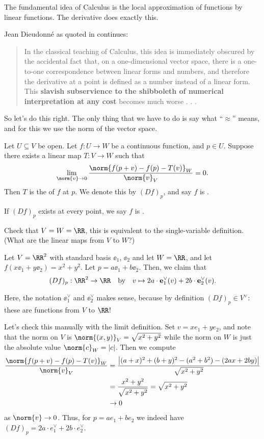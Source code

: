 \documentclass[11pt]{scrreprt}
\begin{document}
\begin{moral}
	The fundamental idea of Calculus is the local approximation of functions by linear functions.
	The derivative does exactly this.
\end{moral}
Jean Dieudonn\'e as quoted in \cite{ref:pugh} continues:
\begin{quote}
	In the classical teaching of Calculus, this idea is immediately obscured
	by the accidental fact that, on a one-dimensional vector space,
	there is a one-to-one correspondence between linear forms and numbers,
	and therefore the derivative at a point is defined as a number instead of a linear form.
	This \textbf{slavish subservience to the shibboleth of numerical interpretation at any cost}
	becomes much worse . . .
\end{quote}

So let's do this right.
The only thing that we have to do is say what ``$\approx$'' means, and for
this we use the norm of the vector space.
\begin{definition}
	Let $U \subseteq V$ be open.
	Let $f : U \to W$ be a continuous function, and $p \in U$.
	Suppose there exists a linear map $T : V \to W$ such that
	\[
		\lim_{\norm{v} \to 0}
		\frac{\norm{f(p + v) - f(p) - T(v)}_W}{\norm{v}_V} = 0.
	\]
	Then $T$ is the  of $f$ at $p$.
	We denote this by $(Df)_p$, and say $f$ is .

	If $(Df)_p$ exists at every point, we say $f$ is .
\end{definition}

\begin{ques}
	Check that $V = W = \RR$, this is equivalent to the single-variable definition.
	(What are the linear maps from $V$ to $W$?)
\end{ques}
\begin{example}[Total Derivative of $f(x,y) = x^2+y^2$]
	Let $V = \RR^2$ with standard basis $\ee_1$, $\ee_2$ and let $W = \RR$,
	and let $f\left( x \ee_1 + y \ee_2 \right) = x^2+y^2$.  Let $p = a\ee_1 + b\ee_2$.
	Then, we claim that \[ (Df)_p : \RR^2 \to \RR \quad\text{by}\quad
	v \mapsto 2a \cdot \ee_1^\vee(v) + 2b \cdot \ee_2^\vee(v). \]
\end{example}
Here, the notation $\ee_1^\vee$ and $\ee_2^\vee$ makes sense,
because by definition $(Df)_p \in V^\vee$: these are functions from $V$ to $\RR$!

Let's check this manually with the limit definition.
Set $v = xe_1 + ye_2$, and note that the norm on $V$ is $\norm{(x,y)}_V = \sqrt{x^2+y^2}$
while the norm on $W$ is just the absolute value $\norm{c}_W = \left\lvert c \right\rvert$.
Then we compute
\begin{align*}
	\frac{\norm{f(p + v) - f(p) - T(v)}_W}{\norm{v}_V} 
	&= \frac{\left\lvert (a+x)^2 + (b+y)^2 - (a^2+b^2) - (2ax+2by) \right\rvert}{\sqrt{x^2+y^2}} \\
	&= \frac{x^2+y^2}{\sqrt{x^2+y^2}} = \sqrt{x^2+y^2} \\
	&\to 0
\end{align*}
as $\norm{v} \to 0$.
Thus, for $p = ae_1 + be_2$ we indeed have $(Df)_p = 2a \cdot e_1^\vee + 2b \cdot e_2^\vee$.
\end{document}
